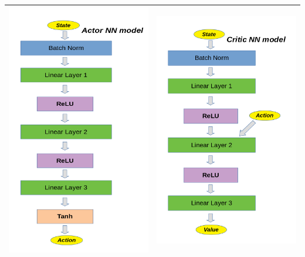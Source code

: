 \documentclass[a4paper]{article}
\begin{document}
\begin{tabular}{ |c|c| }
  \hline
  \includegraphics[scale=0.3]{ActorPic.png} & \includegraphics[scale=0.3]{CriticPic.png} \\
  \hline
\end{tabular}

\textb
\end{document}
